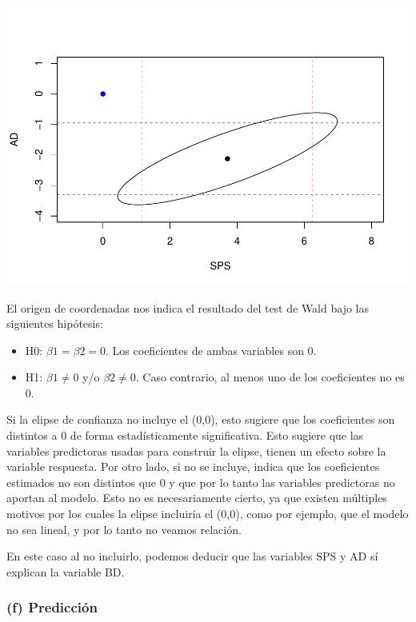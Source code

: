 \documentclass[
]{article}
\providecommand{\tightlist}{%
  \setlength{\itemsep}{0pt}\setlength{\parskip}{0pt}}
\begin{document}
\includegraphics{code_files/figure-latex/unnamed-chunk-6-1.pdf}

El origen de coordenadas nos indica el resultado del test de Wald bajo
las siguientes hipótesis:

\begin{itemize}
\tightlist
\item
  H0: \(\beta1 = \beta2 = 0\). Los coeficientes de ambas variables son
  0.
\item
  H1: \(\beta1\neq0\) y/o \(\beta2\neq0\). Caso contrario, al menos uno
  de los coeficientes no es 0.
\end{itemize}

Si la elipse de confianza no incluye el (0,0), esto sugiere que los
coeficientes son distintos a 0 de forma estadísticamente significativa.
Esto sugiere que las variables predictoras usadas para construir la
elipse, tienen un efecto sobre la variable respuesta. Por otro lado, si
no se incluye, indica que los coeficientes estimados no son distintos
que 0 y que por lo tanto las variables predictoras no aportan al modelo.
Esto no es necesariamente cierto, ya que existen múltiples motivos por
los cuales la elipse incluiría el (0,0), como por ejemplo, que el modelo
no sea lineal, y por lo tanto no veamos relación.

En este caso al no incluirlo, podemos deducir que las variables SPS y AD
sí explican la variable BD.

\hypertarget{f-predicciuxf3n}{%
\subsubsection{(f) Predicción}\label{f-predicciuxf3n}}
\end{document}
